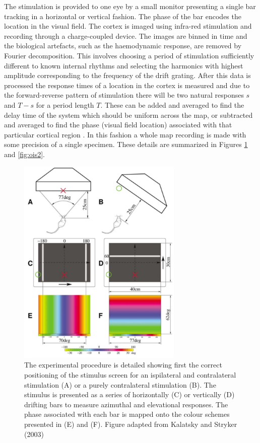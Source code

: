 The stimulation is provided to one eye by a small monitor presenting a single bar tracking in a horizontal or vertical fashion. The phase of the bar encodes the location in the visual field. The cortex is imaged using infra-red stimulation and recording through a charge-coupled device. The images are binned in time and the biological artefacts, such as the haemodynamic response, are removed by Fourier decomposition. This involves choosing a period of stimulation sufficiently different to known internal rhythms and selecting the harmonics with highest amplitude corresponding to the frequency of the drift grating. After this data is processed the response times of a location in the cortex is measured and due to the forward-reverse pattern of stimulation there will be two natural responses $s$ and $T-s$ for a period length $T$. These can be added and averaged to find the delay time of the system which should be uniform across the map, or subtracted and averaged to find the phase (visual field location) associated with that particular cortical region \cite{Kalatsky2003-cz}. In this fashion a whole map recording is made with some precision of a single specimen. These details are summarized in Figures \ref{fig:ois1} and \ref{fig:ois2}.
\begin{figure}[h!]
	\centering
	\includegraphics[width = 0.7\textwidth]{images/introduction/kalatsky_experiment}
	\def\c{The experimental procedure is detailed showing first the correct positioning of the stimulus screen for an ispilateral and contralateral stimulation (A) or a purely contralateral stimulation (B). }
	\caption[\c]{\label{fig:ois1}  \c The stimulus is presented as a series of horizontally (C) or vertically (D) drifting bars to measure azimuthal and elevational responses. The phase associated with each bar is mapped onto the colour schemes presented in (E) and (F). Figure adapted from Kalatsky and Stryker (2003) \cite{Kalatsky2003-cz}}
\end{figure}

